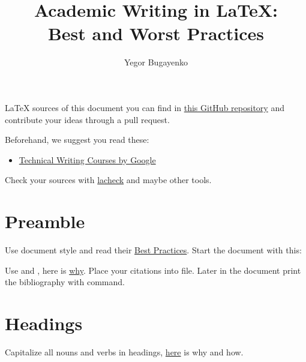 \documentclass[12pt,nonacm,natbib=false]{acmart}
\title{Academic Writing in \LaTeX: \texorpdfstring{\\}{} Best and Worst Practices}
\author{Yegor Bugayenko}
\begin{document}
\pagestyle{plain}
\date{}
\maketitle

\LaTeX{} sources of this document you can find in
\href{https://github.com/yegor256/latex-best-practices}{this GitHub repository}
and contribute your ideas through a pull request.

Beforehand, we suggest you read these:
\begin{itemize}
\item \href{https://developers.google.com/tech-writing/overview}{Technical Writing Courses by Google}
\end{itemize}

Check your  sources with \href{https://www.ctan.org/tex-archive/support/lacheck/}{lacheck}
and maybe other tools.

\section{Preamble}

Use \href{https://ctan.org/pkg/acmart?lang=en}{} document style and read their \href{https://www.acm.org/publications/taps/latex-best-practices}{Best Practices}. Start the document with this:


Use \href{https://ctan.org/pkg/biblatex}{} and \href{https://ctan.org/pkg/biber}{}, here is \href{https://tex.stackexchange.com/a/25702/1449}{why}. Place your citations into  file. Later in the document print the bibliography with  command.

\section{Headings}

Capitalize all nouns and verbs in headings, \href{https://apastyle.apa.org/style-grammar-guidelines/capitalization/title-case}{here} is why and how.
\end{document}
